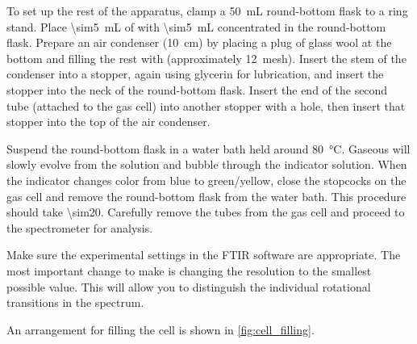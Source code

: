 To set up the rest of the apparatus, clamp a \SI{50}{\mL} round-bottom flask to a ring stand. 
Place \SI{\sim5}{\mL} of  with \SI{\sim5}{\mL} concentrated  in the round-bottom flask.
Prepare an air condenser (\SI{10}{\cm}) by placing a plug of glass wool at the bottom and filling the rest with  (approximately \SI{12}{mesh}). 
Insert the stem of the condenser into a stopper, again using glycerin for lubrication, and insert the stopper into the neck of the round-bottom flask. 
Insert the end of the second tube (attached to the gas cell) into another stopper with a hole, then insert that stopper into the top of the air condenser. 
%

Suspend the round-bottom flask in a water bath held around \SI{80}{\celsius}. 
Gaseous  will slowly evolve from the solution and bubble through the indicator solution. 
When the indicator changes color from blue to green/yellow, close the stopcocks on the gas cell and remove the round-bottom flask from the water bath. 
This procedure should take \SI{\sim20}{\min}. 
Carefully remove the tubes from the gas cell and proceed to the spectrometer for analysis. 

Make sure the experimental settings in the FTIR software are appropriate. 
The most important change to make is changing the resolution to the smallest possible value. 
This will allow you to distinguish the individual rotational transitions in the spectrum. 

An arrangement for filling the cell is shown in \cref{fig:cell_filling}.

